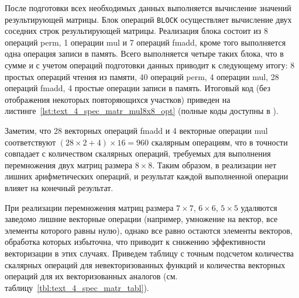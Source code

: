 После подготовки всех необходимых данных выполняется вычисление значений результирующей матрицы.
Блок операций \texttt{BLOCK} осуществляет вычисление двух соседних строк результирующей матрицы.
Реализация блока состоит из 8 операций perm, 1 операции mul и 7 операций fmadd, кроме того выполняется одна операция записи в память.
Всего выполняется четыре таких блока, что в сумме и с учетом операций подготовки данных приводит к следующему итогу: 8 простых операций чтения из памяти, 40 операций perm, 4 операции mul, 28 операций fmadd, 4 простые операции записи в память.
Итоговый код (без отображения некоторых повторяющихся участков) приведен на листинге~\ref{lst:text_4_spec_matr_mul8x8_opt} (полные коды доступны в \cite{iparGithub}).

Заметим, что 28 векторных операций fmadd и 4 векторные операции mul соответствуют $(28 \times 2 + 4) \times 16 = 960$ скалярным операциям, что в точности совпадает с количеством скалярных операций, требуемых для выполнения перемножения двух матриц размера $8 \times 8$.
Таким образом, в реализации нет лишних арифметических операций, и результат каждой выполненной операции влияет на конечный результат.

При реализации перемножения матриц размера $7 \times 7$, $6 \times 6$, $5 \times 5$ удаляются заведомо лишние векторные операции (например, умножение на вектор, все элементы которого равны нулю), однако все равно остаются элементы векторов, обработка которых избыточна, что приводит к снижению эффективности векторизации в этих случаях.
Приведем таблицу с точным подсчетом количества скалярных операций для невекторизованных функций и количества векторных операций для их векторизованных аналогов (см. таблицу~\ref{tbl:text_4_spec_matr_tabl}).

